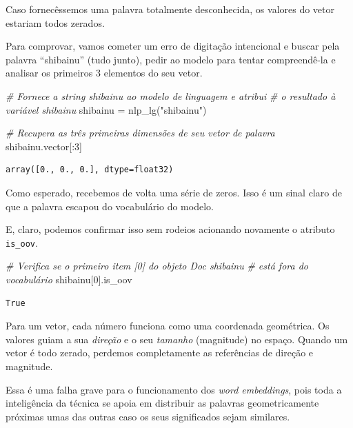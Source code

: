 \documentclass[
  brazilian,
]{article}
\newenvironment{Shaded}{}{}
\newcommand{\CommentTok}[1]{\textcolor[rgb]{0.38,0.63,0.69}{\textit{#1}}}
\newcommand{\DecValTok}[1]{\textcolor[rgb]{0.25,0.63,0.44}{#1}}
\newcommand{\NormalTok}[1]{#1}
\newcommand{\OperatorTok}[1]{\textcolor[rgb]{0.40,0.40,0.40}{#1}}
\newcommand{\StringTok}[1]{\textcolor[rgb]{0.25,0.44,0.63}{#1}}
\begin{document}
Caso fornecêssemos uma palavra totalmente desconhecida, os valores do
vetor estariam todos zerados.

Para comprovar, vamos cometer um erro de digitação intencional e buscar
pela palavra ``shibainu'' (tudo junto), pedir ao modelo para tentar
compreendê-la e analisar os primeiros 3 elementos do seu vetor.

\begin{Shaded}
\begin{Highlighting}[]
\CommentTok{\# Fornece a string \textquotesingle{}shibainu\textquotesingle{} ao modelo de linguagem e atribui}
\CommentTok{\# o resultado à variável \textquotesingle{}shibainu\textquotesingle{}}
\NormalTok{shibainu }\OperatorTok{=}\NormalTok{ nlp\_lg(}\StringTok{"shibainu"}\NormalTok{)}

\CommentTok{\# Recupera as três primeiras dimensões de seu vetor de palavra}
\NormalTok{shibainu.vector[:}\DecValTok{3}\NormalTok{]}
\end{Highlighting}
\end{Shaded}

\begin{verbatim}
array([0., 0., 0.], dtype=float32)
\end{verbatim}

Como esperado, recebemos de volta uma série de zeros. Isso é um sinal
claro de que a palavra escapou do vocabulário do modelo.

E, claro, podemos confirmar isso sem rodeios acionando novamente o
atributo \texttt{is\_oov}.

\begin{Shaded}
\begin{Highlighting}[]
\CommentTok{\# Verifica se o primeiro item [0] do objeto Doc \textquotesingle{}shibainu\textquotesingle{}}
\CommentTok{\# está fora do vocabulário}
\NormalTok{shibainu[}\DecValTok{0}\NormalTok{].is\_oov}
\end{Highlighting}
\end{Shaded}

\begin{verbatim}
True
\end{verbatim}

Para um vetor, cada número funciona como uma coordenada geométrica. Os
valores guiam a sua \emph{direção} e o seu \emph{tamanho} (magnitude) no
espaço. Quando um vetor é todo zerado, perdemos completamente as
referências de direção e magnitude.

Essa é uma falha grave para o funcionamento dos \emph{word embeddings},
pois toda a inteligência da técnica se apoia em distribuir as palavras
geometricamente próximas umas das outras caso os seus significados sejam
similares.
\end{document}
